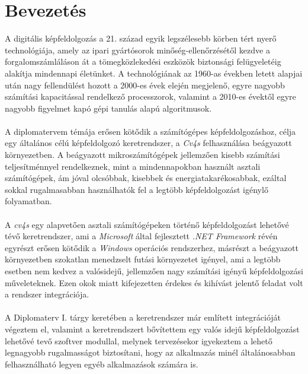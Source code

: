 \chapter{Bevezetés}

A digitális képfeldolgozás a 21. század egyik legszélesebb körben tért nyerő technológiája, amely az ipari gyártósorok minőség-ellenőrzésétől kezdve a forgalomszámláláson át a tömegközlekedési eszközök biztonsági felügyeletéig alakítja mindennapi életünket. A technológiának az 1960-as években letett alapjai után nagy fellendülést hozott a 2000-es évek elején megjelenő, egyre nagyobb számítási kapacitással rendelkező processzorok, valamint a 2010-es évektől egyre nagyobb figyelmet kapó gépi tanulás alapú algoritmusok.\\
\\
A diplomatervem témája erősen kötődik a számítógépes képfeldolgozáshoz, célja egy általános célú képfeldolgozó keretrendszer, a \emph{Cv4s} felhasználása beágyazott környezetben. A beágyazott mikroszámítógépek jellemzően kisebb számítási teljesítménnyel rendelkeznek, mint a mindennapokban használt asztali számítógépek, ám jóval olcsóbbak, kisebbek és energiatakarékosabbak, ezáltal sokkal rugalmasabban használhatók fel a legtöbb képfeldolgozást igénylő folyamatban. \\
\\
A \emph{cv4s} egy alapvetően asztali számítógépeken történő képfeldolgozást lehetővé tévő keretrendszer, ami a \textit{Microsoft} által fejlesztett \emph{.NET Framework} révén egyrészt erősen kötődik a \emph{Windows} operációs rendszerhez, másrészt a beágyazott környezetben szokatlan menedzselt futási környezetet igényel, ami a legtöbb esetben nem kedvez a valósidejű, jellemzően nagy számítási igényű képfeldolgozási műveleteknek. Ezen okok miatt kifejezetten érdekes és kihívást jelentő feladat volt a rendszer integrációja. \\
\\
A Diplomaterv I. tárgy keretében a keretrendszer már említett integrációját végeztem el, valamint a keretrendszert bővítettem egy valós idejű képfeldolgozást lehetővé tevő szoftver modullal, melynek tervezésekor igyekeztem a lehető legnagyobb rugalmasságot biztosítani, hogy az alkalmazás minél általánosabban felhasználható legyen egyéb alkalmazások számára is.